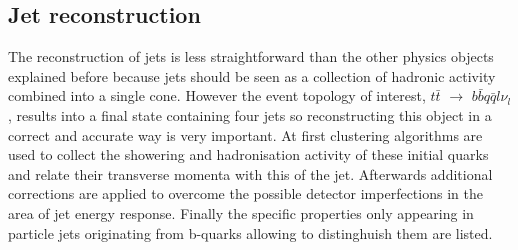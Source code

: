 \subsection{Jet reconstruction}\label{subsec::jetReco}
The reconstruction of jets is less straightforward than the other physics objects explained before because jets should be seen as a collection of hadronic activity combined into a single cone. However the event topology of interest, $t\bar{t}$ $\rightarrow$ $b\bar{b}q\bar{q}l\nu_{l}$, results into a final state containing four jets so reconstructing this object in a correct and accurate way is very important.
At first clustering algorithms are used to collect the showering and hadronisation activity of these initial quarks and relate their transverse momenta with this of the jet.
Afterwards additional corrections are applied to overcome the possible detector imperfections in the area of jet energy response. Finally the specific properties only appearing in particle jets originating from b-quarks allowing to distinghuish them are listed. 


